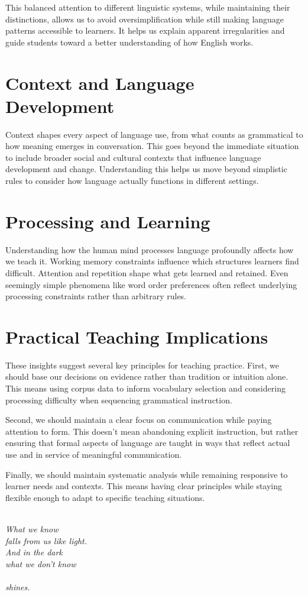 This balanced attention to different linguistic systems, while maintaining their distinctions, allows us to avoid oversimplification while still making language patterns accessible to learners. It helps us explain apparent irregularities and guide students toward a better understanding of how English works.

\section*{Context and Language Development}

Context shapes every aspect of language use, from what counts as grammatical to how meaning emerges in conversation. This goes beyond the immediate situation to include broader social and cultural contexts that influence language development and change. Understanding this helps us move beyond simplistic rules to consider how language actually functions in different settings.

\section*{Processing and Learning}

Understanding how the human mind processes language profoundly affects how we teach it. Working memory constraints influence which structures learners find difficult. Attention and repetition shape what gets learned and retained. Even seemingly simple phenomena like word order preferences often reflect underlying processing constraints rather than arbitrary rules.

\section{Practical Teaching Implications}

These insights suggest several key principles for teaching practice. First, we should base our decisions on evidence rather than tradition or intuition alone. This means using corpus data to inform vocabulary selection and considering processing difficulty when sequencing grammatical instruction.

Second, we should maintain a clear focus on communication while paying attention to form. This doesn't mean abandoning explicit instruction, but rather ensuring that formal aspects of language are taught in ways that reflect actual use and in service of meaningful communication.

Finally, we should maintain systematic analysis while remaining responsive to learner needs and contexts. This means having clear principles while staying flexible enough to adapt to specific teaching situations.


\cleardoublepage\newpage
\thispagestyle{empty}


\epigraph{\textit{\phantom{~}\\[10em]
What we know\\
falls from us like light.\\
\phantom{~~~~}And in the dark\\
\phantom{~~~~}what we don't know\\\\
\phantom{~~~~~~~~~~~~~~~~~~~~~~~~~~~~~~~}shines.\\}}{}
\newpage
